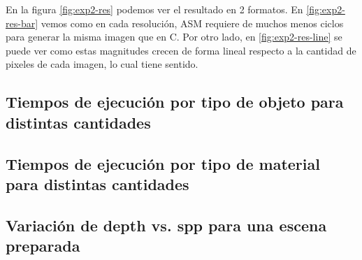 En la figura \ref{fig:exp2-res} podemos ver el resultado en 2 formatos. En
\ref{fig:exp2-res-bar} vemos como en cada resolución, ASM requiere de muchos
menos ciclos para generar la misma imagen que en C. Por otro lado, en
\ref{fig:exp2-res-line} se puede ver como estas magnitudes crecen de forma
lineal respecto a la cantidad de pixeles de cada imagen, lo cual tiene sentido.

\subsection{Tiempos de ejecución por tipo de objeto para distintas cantidades}


\subsection{Tiempos de ejecución por tipo de material para distintas cantidades}


\subsection{Variación de depth vs. spp para una escena preparada}

